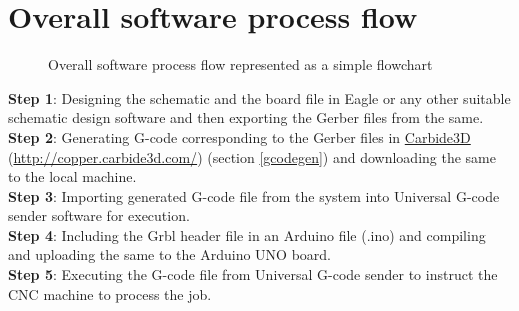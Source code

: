 \section{Overall software process flow}


\begin{figure}[h]
 \centering
 \caption{Overall software process flow represented as a simple flowchart}
 \label{fig:soft_process_flow}
\end{figure}


\hspace{-13.7mm}
\textbf{Step 1}: Designing the schematic and the board file in Eagle or any other suitable schematic design software and then exporting the Gerber files from the same. \\[5mm]
\textbf{Step 2}: Generating G-code corresponding to the Gerber files in \href{http://copper.carbide3d.com/}{Carbide3D} (\url{http://copper.carbide3d.com/}) (section \ref{gcodegen}) and downloading the same to the local machine. \\[5mm]
\textbf{Step 3}: Importing generated G-code file from the system into Universal G-code sender software for execution. \\[5mm]
\textbf{Step 4}: Including the Grbl header file in an Arduino file (.ino) and compiling and uploading the same to the Arduino UNO board. \\[5mm]
\textbf{Step 5}: Executing the G-code file from Universal G-code sender to instruct the CNC machine to process the job.

